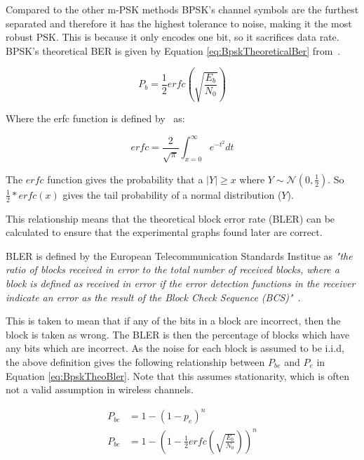 \documentclass[12pt,onecolumn,letterpaper]{article}
\begin{document}
Compared to the other m-PSK methods BPSK's channel symbols are the furthest separated and therefore it has the highest tolerance to noise, making it the most robust PSK. This is because it only encodes one bit, so it sacrifices data rate. BPSK's theoretical BER is given by Equation \ref{eq:BpskTheoreticalBer} from~\cite{BpskPe}.

\begin{equation}
   P_b = \frac{1}{2}erfc\left(\sqrt{\frac{E_b}{N_0}}\right)
   \label{eq:BpskTheoreticalBer}
\end{equation}

Where the erfc function is defined by~\cite{ErfcDefinition} as:

\begin{equation}
   erfc = \frac{2}{\sqrt{\pi}}\int_{x=0}^{\infty}e^{-t^2}dt
   \label{eq:ErfcDef}
\end{equation}

The $erfc$ function gives the probability that a $\left| Y \right| \ge x$ where $Y \sim \mathcal{N}(0,\frac{1}{2})$. So $\frac{1}{2}*erfc(x)$ gives the tail probability of a normal distribution ($Y$). 

This relationship means that the theoretical block error rate (BLER) can be calculated to ensure that the experimental graphs found later are correct.

BLER is defined by the European Telecommunication Standards Institue as \textit{"the ratio of blocks received in error to the total number of received blocks, where a block is defined as received in error if the error detection functions in the receiver indicate an error as the result of the Block Check Sequence (BCS)"}~\cite{BlerEtsiDefinition}.

This is taken to mean that if any of the bits in a block are incorrect, then the block is taken as wrong. The BLER is then the percentage of blocks which have any bits which are incorrect. As the noise for each block is assumed to be i.i.d, the above definition gives the following relationship between $P_{be}$ and $P_e$ in Equation \ref{eq:BpskTheoBler}. Note that this assumes stationarity, which is often not a valid assumption in wireless channels.

\begin{align}
   P_{be} &= 1 - (1-p_e)^n \\
   P_{be} &= 1 - \left(1-\frac{1}{2}erfc\left(\sqrt{\frac{E_b}{N_0}}\right)\right)^n
   \label{eq:BpskTheoBler}
\end{align}
\end{document}
